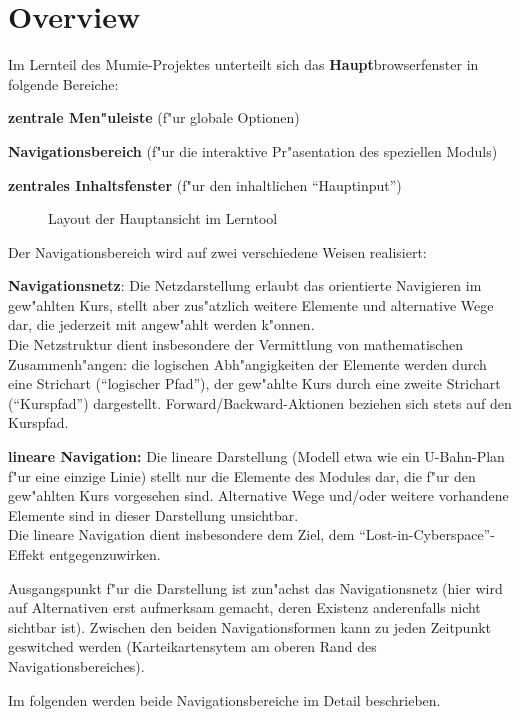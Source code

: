 
\section{Overview}\label{overview}


Im Lernteil des Mumie-Projektes unterteilt sich das
\textbf{Haupt}browserfenster in folgende Bereiche:

\begin{list_sabina}
        \item \textbf{zentrale Men"uleiste} (f"ur globale Optionen)
        \item \textbf{Navigationsbereich} (f"ur die interaktive Pr"asentation des speziellen Moduls)
        \item \textbf{zentrales Inhaltsfenster} (f"ur den inhaltlichen ``Hauptinput'')
\end{list_sabina}

\begin{figure}[h]
\begin{center}
\caption{Layout der Hauptansicht im Lerntool}
\end{center}
\end{figure}


Der Navigationsbereich wird auf zwei verschiedene Weisen realisiert:

\begin{list_sabina}
        \item \textbf{Navigationsnetz}: Die Netzdarstellung erlaubt das orientierte
          Navigieren im gew"ahlten Kurs, stellt aber zus"atzlich weitere
          Elemente und alternative Wege dar, die jederzeit mit angew"ahlt
          werden k"onnen. \\
          Die Netzstruktur dient insbesondere der Vermittlung von
          mathematischen Zusammenh"angen: die logischen Abh"angigkeiten der
          Elemente werden durch eine Strichart (``logischer Pfad''), 
          der gew"ahlte Kurs durch eine zweite Strichart (``Kurspfad'')
          dargestellt. Forward/Backward-Aktionen beziehen sich stets
          auf den Kurspfad.
        \item \textbf{lineare Navigation:} Die lineare Darstellung (Modell
          etwa wie ein U-Bahn-Plan f"ur eine einzige Linie) stellt nur die
          Elemente des Modules dar, die f"ur den gew"ahlten Kurs vorgesehen
          sind. Alternative Wege und/oder weitere vorhandene Elemente sind in
          dieser Darstellung unsichtbar.\\
	  Die lineare Navigation dient insbesondere dem Ziel, dem 
	  ``Lost-in-Cyberspace''-Effekt entgegenzuwirken.
\end{list_sabina}


Ausgangspunkt f"ur die Darstellung ist zun"achst das Navigationsnetz (hier
wird auf Alternativen erst aufmerksam gemacht, deren Existenz anderenfalls
nicht sichtbar ist). Zwischen den beiden Navigationsformen kann zu jeden
Zeitpunkt geswitched werden (Karteikartensytem am oberen Rand des
Navigationsbereiches).


Im folgenden werden beide Navigationsbereiche im Detail beschrieben.

